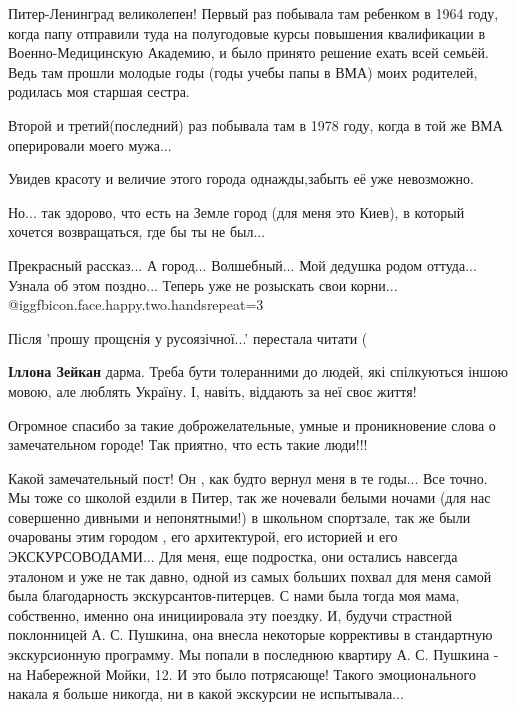 \begin{itemize}

Питер-Ленинград великолепен! Первый раз побывала там ребенком в 1964 году, когда
папу отправили туда на полугодовые курсы повышения квалификации в
Военно-Медицинскую Академию, и было принято решение ехать всей семьёй. Ведь там
прошли молодые годы (годы учебы папы в ВМА) моих родителей, родилась моя старшая
сестра.

Второй и третий(последний) раз побывала там в 1978 году, когда в той же ВМА оперировали моего мужа...

Увидев красоту и величие этого города однажды,забыть её уже невозможно.

Но... так здорово, что есть на Земле город (для меня это Киев), в который хочется возвращаться, где бы ты не был...

Прекрасный рассказ...
А город...
Волшебный...
Мой дедушка родом оттуда...
Узнала об этом поздно...
Теперь уже не розыскать свои корни...
 @igg{fbicon.face.happy.two.hands}{repeat=3} 

Після 'прошу прощєнія у русоязічної...' перестала читати (

\begin{itemize} %
\textbf{Іллона Зейкан} дарма. Треба бути толеранними до людей, які спілкуються іншою мовою, але люблять Україну. І, навіть, віддають за неї своє життя!
\end{itemize} %

Огромное спасибо за такие доброжелательные, умные и проникновение слова о замечательном городе! Так приятно, что есть такие люди!!!


Какой замечательный пост! Он , как будто вернул меня в те годы... Все точно. Мы
тоже со школой ездили в Питер, так же ночевали белыми ночами (для нас
совершенно дивными и непонятными!) в школьном спортзале, так же были очарованы
этим городом , его архитектурой, его историей и его ЭКСКУРСОВОДАМИ... Для меня,
еще подростка, они остались навсегда эталоном и уже не так давно, одной из
самых больших похвал для меня самой была благодарность экскурсантов-питерцев. С
нами была тогда моя мама, собственно, именно она инициировала эту поездку. И,
будучи страстной поклонницей А. С. Пушкина, она внесла некоторые коррективы в
стандартную экскурсионную программу. Мы попали в последнюю квартиру А. С.
Пушкина - на Набережной Мойки, 12. И это было потрясающе! Такого эмоционального
накала я больше никогда, ни в какой экскурсии не испытывала... 


\end{itemize}
